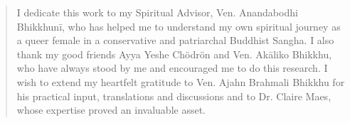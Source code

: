 \clearpage
\thispagestyle{empty}
\begin{quote}
I dedicate this work to my Spiritual Advisor, Ven. Anandabodhi Bhikkhunī, who has helped me to understand my own spiritual journey as a queer female in a conservative and patriarchal Buddhist Sangha. I also thank my good friends Ayya Yeshe Chödrön and Ven. Akāliko Bhikkhu, who have always stood by me and encouraged me to do this research. I wish to extend my heartfelt gratitude to Ven. Ajahn Brahmali Bhikkhu for his practical input, translations and discussions and to Dr. Claire Maes, whose expertise proved an invaluable asset.
\end{quote}
